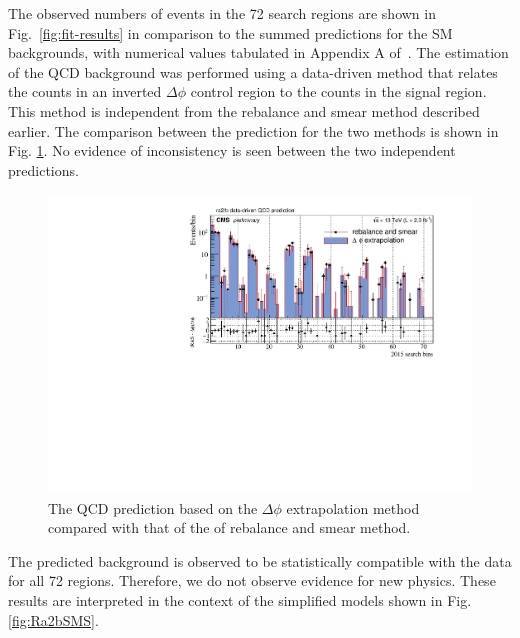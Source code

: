 The observed numbers of events in the 72 search regions
are shown in Fig.~\ref{fig:fit-results}
in comparison to the summed predictions for the SM backgrounds,
with numerical values tabulated in Appendix A of~\cite{Khachatryan:2016kdk}. The estimation of the QCD background was performed using a data-driven method \cite{Khachatryan:2016kdk} that relates the counts in an inverted $\Delta\phi$ control region to the counts in the signal region. This method is independent from the rebalance and smear method described earlier. 
The comparison between the prediction for the two methods is shown in Fig. \ref{fig:2015CompareQCD}. No evidence of inconsistency is seen between the two independent predictions.
\begin{figure}[ht]
\centering
\includegraphics[width=\linewidth]{figures/SusySearches/Ra2b2015/2015CompareQCD.pdf}
\caption{
  The QCD prediction based on the $\Delta\phi$ extrapolation method compared with that of the of rebalance and smear method.}
\label{fig:2015CompareQCD}
\end{figure}
The predicted background is observed to be statistically compatible
with the data for all 72 regions.
Therefore, we do not observe evidence for new physics.
These results are interpreted in the context of the simplified models shown in Fig. \ref{fig:Ra2bSMS}.

